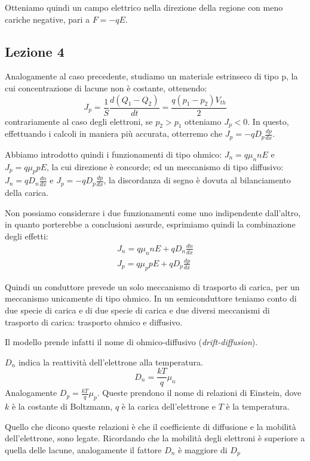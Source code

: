 \documentclass[../template]{subfiles}
\begin{document}
Otteniamo quindi un campo elettrico nella direzione della regione con meno cariche negative, pari a $F = -qE$.

\subsection{Lezione 4}
Analogamente al caso precedente, studiamo un materiale estrinseco di tipo p, la cui concentrazione di lacune non è costante, ottenendo:
\[
    J_p = \frac{1}{S}\frac{d(Q_1 - Q_2)}{dt} = \frac{q(p_1 - p_2) V_{th}}{2}
\]
contrariamente al caso degli elettroni, se $p_2 > p_1$ otteniamo $J_p < 0$.
In questo, effettuando i calcoli in maniera più accurata, otterremo che $J_p = -qD_p \frac{dp}{dx}$.

Abbiamo introdotto quindi i funzionamenti di tipo ohmico: $J_n = q\mu_n n E$ e $J_p = q \mu_p p E$, la cui direzione è concorde;
ed un meccanismo di tipo diffusivo: $J_n = q D_n \frac{dn}{dx}$ e $J_p = -qD_p \frac{dp}{dx}$, la discordanza di segno è dovuta al bilanciamento della carica.

Non possiamo considerare i due funzionamenti come uno indipendente dall'altro, in quanto porterebbe a conclusioni assurde, esprimiamo quindi la combinazione degli effetti:
\begin{align*}
    J_n = q \mu_n n E + q D_n \frac{dn}{dx} \\
    J_p = q \mu_p p E + q D_p \frac{dp}{dx}
\end{align*}

Quindi un conduttore prevede un solo meccanismo di trasporto di carica, per un meccanismo unicamente di tipo ohmico. In un semiconduttore teniamo conto di due specie di carica e di due specie di carica e due diversi meccanismi di trasporto di carica: trasporto ohmico e diffusivo.

Il modello prende infatti il nome di ohmico-diffusivo (\textit{drift-diffusion}).

$D_n$ indica la reattività dell'elettrone alla temperatura.
\[
    D_n = \frac{kT}{q} \mu_n
\]
Analogamente $D_p = \frac{kT}{q}\mu_p$. Queste prendono il nome di relazioni di Einstein, dove $k$ è la costante di Boltzmann, $q$ è la carica dell'elettrone e $T$ è la temperatura.

Quello che dicono queste relazioni è che il coefficiente di diffusione e la mobilità dell'elettrone, sono legate.
Ricordando che la mobilità degli elettroni è superiore a quella delle lacune, analogamente il fattore $D_n$ è maggiore di $D_p$
\end{document}
